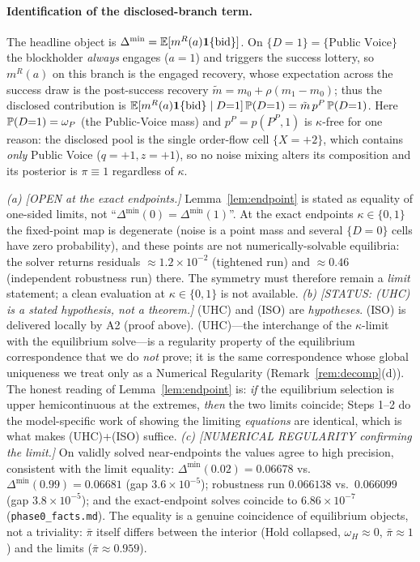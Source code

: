 \paragraph{Identification of the disclosed-branch term.}
The headline object is $\Delta^{\min}=\mathbb{E}[m^{R}(a)\mathbf{1}\{\text{bid}\}]$. On
$\{D=1\}=\{\text{Public Voice}\}$ the blockholder \emph{always} engages
($a=1$) and triggers the success lottery, so $m^{R}(a)$ on this branch is the
engaged recovery, whose expectation across the success draw is the post-success
recovery $\tilde m=m_0+\rho(m_1-m_0)$; thus the disclosed contribution is
$\mathbb{E}[m^{R}(a)\mathbf{1}\{\text{bid}\}\mid D{=}1]\,\mathbb{P}(D{=}1)=\tilde m\,p^{P}\,\mathbb{P}(D{=}1)$.
Here $\mathbb{P}(D{=}1)=\omega_P$ (the Public-Voice mass) and $p^{P}=p(P^{P},1)$ is
$\kappa$-free for one reason: the disclosed pool is the single order-flow cell
$\{X{=}{+}2\}$, which contains \emph{only} Public Voice ($q{=}{+}1,z{=}{+}1$), so
no noise mixing alters its composition and its posterior is $\pi\equiv1$
regardless of $\kappa$.

\begin{remark}\label{rem:limit}
\emph{(a) [OPEN at the exact endpoints.]} Lemma~\ref{lem:endpoint} is stated as
equality of one-sided limits, not ``$\Delta^{\min}(0)=\Delta^{\min}(1)$''. At the
exact endpoints $\kappa\in\{0,1\}$ the fixed-point map is degenerate (noise is a
point mass and several $\{D=0\}$ cells have zero probability), and these points
are not numerically-solvable equilibria: the solver returns residuals
$\approx1.2\times10^{-2}$ (tightened run) and $\approx0.46$ (independent
robustness run) there. The symmetry must therefore remain a \emph{limit}
statement; a clean evaluation at $\kappa\in\{0,1\}$ is not available.
\emph{(b) [STATUS: (UHC) is a stated hypothesis, not a theorem.]} (UHC) and (ISO)
are \emph{hypotheses}. (ISO) is delivered locally by A2 (proof above).
(UHC)---the interchange of the $\kappa$-limit with the equilibrium solve---is a
regularity property of the equilibrium correspondence that we do \emph{not}
prove; it is the same correspondence whose global uniqueness we treat only as a
Numerical Regularity (Remark~\ref{rem:decomp}(d)). The honest reading of
Lemma~\ref{lem:endpoint} is: \emph{if} the equilibrium selection is upper
hemicontinuous at the extremes, \emph{then} the two limits coincide; Steps 1--2
do the model-specific work of showing the limiting \emph{equations} are
identical, which is what makes (UHC)+(ISO) suffice.
\emph{(c) [NUMERICAL REGULARITY confirming the limit.]} On validly solved
near-endpoints the values agree to high precision, consistent with the limit
equality: $\Delta^{\min}(0.02)=0.06678$ vs.\ $\Delta^{\min}(0.99)=0.06681$ (gap
$3.6\times10^{-5}$); robustness run $0.066138$ vs.\ $0.066099$ (gap
$3.8\times10^{-5}$); and the exact-endpoint solves coincide to $6.86\times10^{-7}$
(\texttt{phase0\_facts.md}). The equality is a genuine coincidence of equilibrium
objects, not a triviality: $\bar\pi$ itself differs between the interior (Hold
collapsed, $\omega_H\approx0$, $\bar\pi\approx1$) and the limits
($\bar\pi\approx0.959$).
\end{remark}

